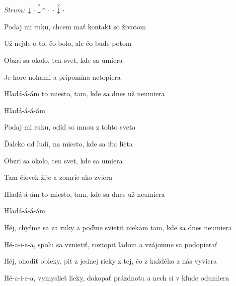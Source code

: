 \begin{song}


\begin{headerbox}
\RaiseBoxWithChucks
\textit{Strum:} $\Down\Miss\ChuckDown\Up\Miss\Miss\ChuckDown\Miss$
\end{headerbox}

\begin{hchordbox}
\end{hchordbox}

\large

\bigskip

 Podaj mi ruku, chcem mať kontakt so životom \par
{} Už nejde o to, čo bolo, ale čo bude potom \par
{} Obzri sa okolo, ten svet, kde sa umiera \par
{} Je hore nohami a pripomína netopiera \par

\bigskip

 Hľadá-á-ám to miesto, tam, kde sa dnes už neumiera \par
{} Hľadá-á-á-ám  \par

\bigskip

 Podaj mi ruku, odíď so mnou z tohto sveta \par
{} Ďaleko od ľudí, na miesto, kde sa iba lieta \par
{} Obzri sa okolo, ten svet, kde sa umiera \par
{} Tam človek žije a zomrie ako zviera \par

\bigskip

 Hľadá-á-ám to miesto, tam, kde sa dnes už neumiera \par
{} Hľadá-á-á-ám  \par

\bigskip

Héj, chyťme sa za ruky a poďme svietiť niekam tam, kde sa dnes neumiera \par
{} Hé-a-i-e-a,  spolu sa vznietiť,  roztopiť ľadom a vzájomne sa podopierať \par
{} Héj, ohodiť obleky, piť z jednej rieky z tej, čo z každého z nás vyviera \par
{} Hé-a-i-e-a,  vymyslieť lieky,  dokopať prázdnotu a nech si v kľude odumiera \par


\end{song}
